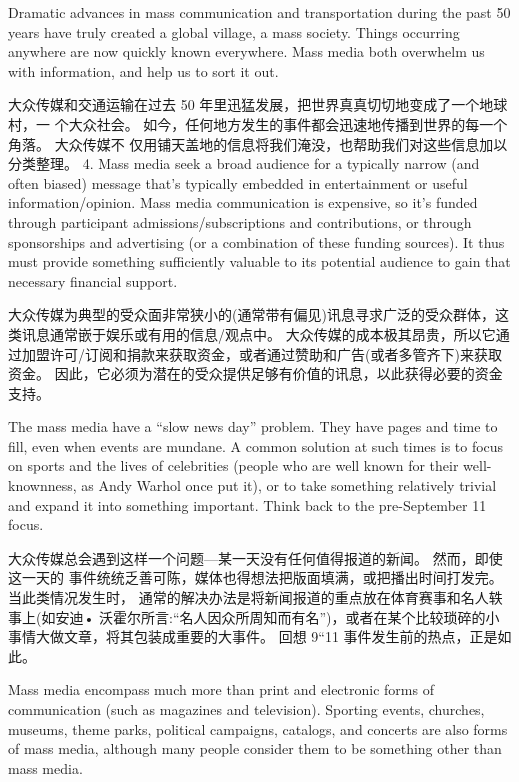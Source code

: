 \documentclass[cs4size, a4paper, 12pt]{article}
\newcounter{numpar}
\newcommand*{\newpar}{\numpar{}}
\begin{document}
	\newpar Dramatic advances in mass communication and transportation during the past 50 years have truly created a global village, a mass society. Things occurring anywhere are now quickly known everywhere. Mass media both overwhelm us with information, and help us to sort it out.
	
	大众传媒和交通运输在过去 50 年里迅猛发展，把世界真真切切地变成了一个地球村，一 个大众社会。 如今，任何地方发生的事件都会迅速地传播到世界的每一个角落。 大众传媒不 仅用铺天盖地的信息将我们淹没，也帮助我们对这些信息加以分类整理。 4. Mass media seek a broad audience for a typically narrow (and often biased) message that's typically embedded in entertainment or useful information/opinion. Mass media communication is expensive, so it's funded through participant admissions/subscriptions and contributions, or through  sponsorships and advertising (or a combination of these funding sources). It thus must provide something sufficiently valuable to its potential audience to gain that necessary financial support.
	
	大众传媒为典型的受众面非常狭小的(通常带有偏见)讯息寻求广泛的受众群体，这类讯息通常嵌于娱乐或有用的信息/观点中。 大众传媒的成本极其昂贵，所以它通过加盟许可/订阅和捐款来获取资金，或者通过赞助和广告(或者多管齐下)来获取资金。 因此，它必须为潜在的受众提供足够有价值的讯息，以此获得必要的资金支持。 
	
	\newpar The mass media have a ``slow news day'' problem. They have pages and time to fill, even when events are mundane. A common solution at such times is to focus on sports and the lives of celebrities (people who are well known for their well-knownness, as Andy Warhol once put it), or to take something relatively trivial and expand it into something important. Think back to the pre-September 11 focus.
	
	大众传媒总会遇到这样一个问题—某一天没有任何值得报道的新闻。 然而，即使这一天的 事件统统乏善可陈，媒体也得想法把版面填满，或把播出时间打发完。 当此类情况发生时， 通常的解决办法是将新闻报道的重点放在体育赛事和名人轶事上(如安迪• 沃霍尔所言:``名人因众所周知而有名'')，或者在某个比较琐碎的小事情大做文章，将其包装成重要的大事件。 回想 9``11 事件发生前的热点，正是如此。 
	
	\newpar Mass media encompass much more than print and electronic forms of  communication (such as magazines and television). Sporting events, churches, museums, theme parks, political campaigns, catalogs, and concerts are also forms of mass media, although many people consider them to be something other than mass media.
	
\end{document}
